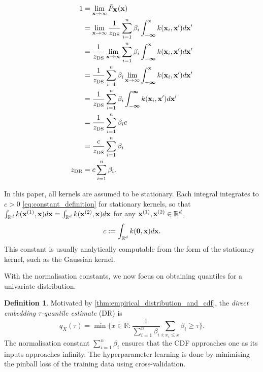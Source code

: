 \documentclass[twoside]{article} \usepackage{aistats2017}
\theoremstyle{definition}
\newtheorem{definition}{Definition}[section]
\theoremstyle{theorem}
\newcommand{\rv}[1]{{#1}}
\begin{document}
		\begin{equation}
			\begin{aligned}
				1 &= \lim_{\bvec{x} \to \infty} \tilde{P}_{\bvec{\rv{X}}}(\bvec{x}) \\
				&= \lim_{\bvec{x} \to \infty} \frac{1}{z_{\mathrm{DS}}} \sum_{i = 1}^{n} \beta_{i} \int_{-\bm{\infty}}^{\bvec{x}}  k(\bvec{x}_{i}, \bvec{x}') d\bvec{x}' \\
				&= \frac{1}{z_{\mathrm{DS}}} \lim_{\bvec{x} \to \infty} \sum_{i = 1}^{n} \beta_{i} \int_{-\bm{\infty}}^{\bvec{x}}  k(\bvec{x}_{i}, \bvec{x}') d\bvec{x}' \\
				&= \frac{1}{z_{\mathrm{DS}}} \sum_{i = 1}^{n} \beta_{i} \lim_{\bvec{x} \to \infty} \int_{-\bm{\infty}}^{\bvec{x}}  k(\bvec{x}_{i}, \bvec{x}') d\bvec{x}' \\
				&= \frac{1}{z_{\mathrm{DS}}} \sum_{i = 1}^{n} \beta_{i} \int_{-\bm{\infty}}^{\bm{\infty}}  k(\bvec{x}_{i}, \bvec{x}') d\bvec{x}' \\
				&= \frac{1}{z_{\mathrm{DS}}} \sum_{i = 1}^{n} \beta_{i} c \\
				&= \frac{c}{z_{\mathrm{DS}}} \sum_{i = 1}^{n} \beta_{i} \\
				z_{\mathrm{DR}} &= c \sum_{i = 1}^{n} \beta_{i}.
			\end{aligned}
		\label{eq:normalisation_constant_ds}
		\end{equation}
		
		In this paper, all kernels are assumed to be stationary. Each integral integrates to $c > 0$ \eqref{eq:constant_definition} for stationary kernels, so that $\int_{\mathbb{R}^{d}} k(\mathbf{x}^{(1)}, \mathbf{x}) d\mathbf{x} = \int_{\mathbb{R}^{d}} k(\mathbf{x}^{(2)}, \mathbf{x}) d\mathbf{x}$ for any $\mathbf{x}^{(1)}, \mathbf{x}^{(2)} \in \mathbb{R}^{d}$,
		\begin{equation}
			c := \int_{\mathbb{R}^{d}} k(\mathbf{0}, \mathbf{x}) d\mathbf{x}.
		\label{eq:constant_definition}
		\end{equation}
		This constant is usually analytically computable from the form of the stationary kernel, such as the Gaussian kernel.
		
		With the normalisation constants, we now focus on obtaining quantiles for a univariate distribution.

		\theoremstyle{definition}
		\begin{definition}
			Motivated by \cref{thm:empirical_distribution_and_cdf}, the \textit{direct embedding $\tau$-quantile estimate} (DR) is
			\begin{equation}
			q_{\rv{X}}(\tau) = \min\{x \in \mathbb{R} : \frac{1}{\sum_{i = 1}^{n} \beta_{i}} \sum_{i : x_{i} \leq x} \beta_{i} \geq \tau\}.
			\end{equation}	
			The normalisation constant $\sum_{i = 1}^{n} \beta_{i}$ ensures that the CDF approaches one as its inputs approaches infinity. The hyperparameter learning is done by minimising the pinball loss of the training data using cross-validation.
		\end{definition}
		
\end{document}

